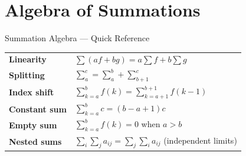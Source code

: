 \section{Algebra of Summations}
\label{sec:summation-algebra}

\begin{toolkitbox}{Summation Algebra --- Quick Reference}
\renewcommand{\arraystretch}{1.5}
\begin{tabular}{@{}ll@{}}
\textbf{Linearity} & $\sum(af+bg) = a\sum f + b\sum g$ \\
\textbf{Splitting} & $\sum_a^c = \sum_a^b + \sum_{b+1}^c$ \\
\textbf{Index shift} & $\sum_{k=a}^{b} f(k) = \sum_{k=a+1}^{b+1} f(k-1)$ \\
\textbf{Constant sum} & $\sum_{k=a}^{b} c = (b-a+1)c$ \\
\textbf{Empty sum} & $\sum_{k=a}^{b} f(k) = 0$ when $a > b$ \\
\textbf{Nested sums} & $\sum_i\sum_j a_{ij} = \sum_j\sum_i a_{ij}$ (independent limits) \\
\end{tabular}
\end{toolkitbox}


